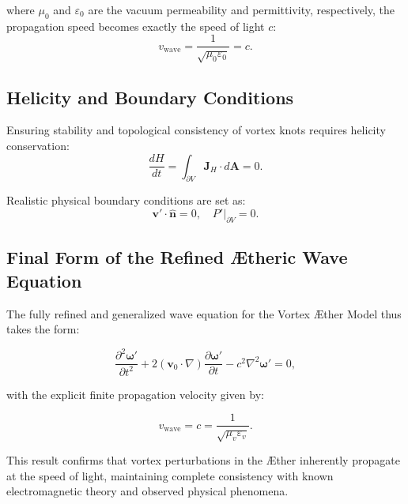 where $\mu_0$ and $\varepsilon_0$ are the vacuum permeability and permittivity, respectively, the propagation speed becomes exactly the speed of light $c$:
\begin{equation}
    v_\text{wave} = \frac{1}{\sqrt{\mu_0 \varepsilon_0}} = c.
\end{equation}


\subsection{Helicity and Boundary Conditions}


Ensuring stability and topological consistency of vortex knots requires helicity conservation:
\begin{equation}
    \frac{dH}{dt} = \int_{\partial V} \mathbf{J}_H \cdot d\mathbf{A} = 0.
\end{equation}


Realistic physical boundary conditions are set as:
\begin{equation}
    \mathbf{v}' \cdot \hat{\mathbf{n}} = 0, \quad P'|_{\partial V} = 0.
\end{equation}


\subsection{Final Form of the Refined Ætheric Wave Equation}


The fully refined and generalized wave equation for the Vortex Æther Model thus takes the form:


\begin{equation}
    \frac{\partial^2 \boldsymbol{\omega}'}{\partial t^2}+2(\mathbf{v}_0\cdot\nabla)\frac{\partial\boldsymbol{\omega}'}{\partial t} - c^2\nabla^2\boldsymbol{\omega}' = 0,
\end{equation}


with the explicit finite propagation velocity given by:


\begin{equation}
    v_\text{wave} = c = \frac{1}{\sqrt{\mu_v \varepsilon_v}}.
\end{equation}


This result confirms that vortex perturbations in the Æther inherently propagate at the speed of light, maintaining complete consistency with known electromagnetic theory and observed physical phenomena.
